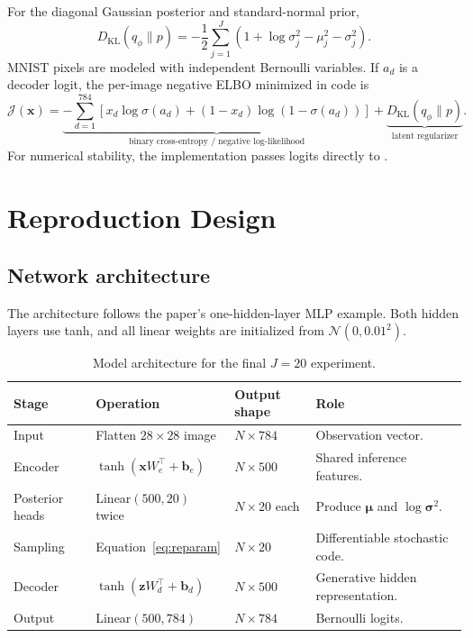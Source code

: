 \documentclass[11pt]{article}
\newcommand{\KL}{D_{\mathrm{KL}}}
\begin{document}
For the diagonal Gaussian posterior and standard-normal prior,
\begin{equation}
  \KL(q_\phi\|p)=
  -\frac12\sum_{j=1}^{J}
  \left(1+\log\sigma_j^2-\mu_j^2-\sigma_j^2\right).
  \label{eq:kl}
\end{equation}
MNIST pixels are modeled with independent Bernoulli variables. If $a_d$ is a decoder logit, the per-image negative ELBO minimized in code is
\begin{equation}
  \mathcal{J}(\bm{x})=
  \underbrace{-\sum_{d=1}^{784}\left[x_d\log \sigma(a_d)+(1-x_d)\log(1-\sigma(a_d))\right]}_{\text{binary cross-entropy / negative log-likelihood}}
  +\underbrace{\KL(q_\phi\|p)}_{\text{latent regularizer}}.
  \label{eq:loss}
\end{equation}
For numerical stability, the implementation passes logits directly to
.

\section{Reproduction Design}

\subsection{Network architecture}

The architecture follows the paper's one-hidden-layer MLP example. Both hidden layers use tanh, and all linear weights are initialized from $\mathcal{N}(0,0.01^2)$.

\begin{table}[H]
\centering
\caption{Model architecture for the final $J=20$ experiment.}
\label{tab:architecture}
\begin{tabularx}{0.92\textwidth}{@{}l l l X@{}}
\toprule
Stage & Operation & Output shape & Role \\
\midrule
Input & Flatten $28\times28$ image & $N\times784$ & Observation vector. \\
Encoder & $\tanh(\bm{x}W_e^\top+\bm{b}_e)$ & $N\times500$ & Shared inference features. \\
Posterior heads & Linear$(500,20)$ twice & $N\times20$ each & Produce $\bm{\mu}$ and $\log\bm{\sigma}^2$. \\
Sampling & Equation~\eqref{eq:reparam} & $N\times20$ & Differentiable stochastic code. \\
Decoder & $\tanh(\bm{z}W_d^\top+\bm{b}_d)$ & $N\times500$ & Generative hidden representation. \\
Output & Linear$(500,784)$ & $N\times784$ & Bernoulli logits. \\
\bottomrule
\end{tabularx}
\end{table}
\end{document}
